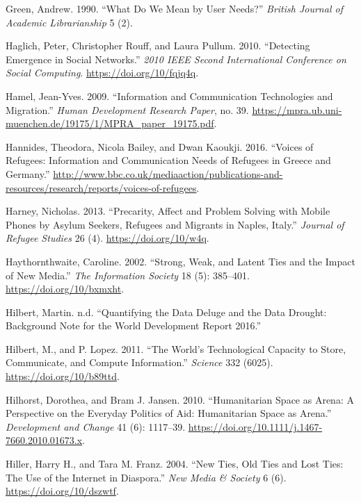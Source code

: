 \begin{cslreferences}
\leavevmode\hypertarget{ref-Green1990What}{}%
Green, Andrew. 1990. ``What Do We Mean by User Needs?'' \emph{British
Journal of Academic Librarianship} 5 (2).

\leavevmode\hypertarget{ref-Haglich2010Detecting}{}%
Haglich, Peter, Christopher Rouff, and Laura Pullum. 2010. ``Detecting
Emergence in Social Networks.'' \emph{2010 IEEE Second International
Conference on Social Computing}. \url{https://doi.org/10/fqjq4q}.

\leavevmode\hypertarget{ref-Hamel2009Information}{}%
Hamel, Jean-Yves. 2009. ``Information and Communication Technologies and
Migration.'' \emph{Human Development Research Paper}, no. 39.
\url{https://mpra.ub.uni-muenchen.de/19175/1/MPRA_paper_19175.pdf}.

\leavevmode\hypertarget{ref-Hannides2016Voices}{}%
Hannides, Theodora, Nicola Bailey, and Dwan Kaoukji. 2016. ``Voices of
Refugees: Information and Communication Needs of Refugees in Greece and
Germany.''
\url{http://www.bbc.co.uk/mediaaction/publications-and-resources/research/reports/voices-of-refugees}.

\leavevmode\hypertarget{ref-Harney2013Precarity}{}%
Harney, Nicholas. 2013. ``Precarity, Affect and Problem Solving with
Mobile Phones by Asylum Seekers, Refugees and Migrants in Naples,
Italy.'' \emph{Journal of Refugee Studies} 26 (4).
\url{https://doi.org/10/w4q}.

\leavevmode\hypertarget{ref-Haythornthwaite2002Strong}{}%
Haythornthwaite, Caroline. 2002. ``Strong, Weak, and Latent Ties and the
Impact of New Media.'' \emph{The Information Society} 18 (5): 385--401.
\url{https://doi.org/10/bxmxht}.

\leavevmode\hypertarget{ref-HilbertQuantifying}{}%
Hilbert, Martin. n.d. ``Quantifying the Data Deluge and the Data
Drought: Background Note for the World Development Report 2016.''

\leavevmode\hypertarget{ref-Hilbert2011Worlds}{}%
Hilbert, M., and P. Lopez. 2011. ``The World's Technological Capacity to
Store, Communicate, and Compute Information.'' \emph{Science} 332
(6025). \url{https://doi.org/10/b89ttd}.

\leavevmode\hypertarget{ref-Hilhorst2010Humanitarian}{}%
Hilhorst, Dorothea, and Bram J. Jansen. 2010. ``Humanitarian Space as
Arena: A Perspective on the Everyday Politics of Aid: Humanitarian Space
as Arena.'' \emph{Development and Change} 41 (6): 1117--39.
\url{https://doi.org/10.1111/j.1467-7660.2010.01673.x}.

\leavevmode\hypertarget{ref-Hiller2004New}{}%
Hiller, Harry H., and Tara M. Franz. 2004. ``New Ties, Old Ties and Lost
Ties: The Use of the Internet in Diaspora.'' \emph{New Media \& Society}
6 (6). \url{https://doi.org/10/dszwtf}.


\end{cslreferences}
